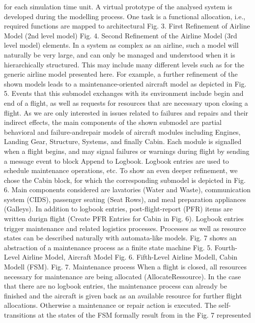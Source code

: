 for each simulation time unit.
A virtual prototype of the analysed system is developed
during the modelling process. One task is a functional allocation, i.e., required functions are mapped to architectural
Fig. 3. First Refinement of Airline Model (2nd level model)
Fig. 4. Second Refinement of the Airline Model (3rd level model)
elements. In a system as complex as an airline, such a model
will naturally be very large, and can only be managed and
understood when it is hierarchically structured. This may
include many different levels such as for the generic airline
model presented here. For example, a further refinement of the
shown models leads to a maintenance-oriented aircraft model
as depicted in Fig. 5. Events that this submodel exchanges
with its environment include begin and end of a flight, as well
as requests for resources that are necessary upon closing a
flight. As we are only interested in issues related to failures
and repairs and their indirect effects, the main components
of the shown submodel are partial behavioral and failure-andrepair models of aircraft modules including Engines, Landing
Gear, Structure, Systems, and finally Cabin. Each module
is signalled when a flight begins, and may signal failures or
warnings during flight by sending a message event to block
Append to Logbook. Logbook entries are used to schedule
maintenance operations, etc.
To show an even deeper refinement, we chose the Cabin
block, for which the corresponding submodel is depicted in
Fig. 6. Main components considered are lavatories (Water and
Waste), communication system (CIDS), passenger seating
(Seat Rows), and meal preparation appliances (Galleys).
In addition to logbook entries, post-flight-report (PFR)
items are written durign flight (Create PFR Entries for Cabin
in Fig. 6). Logbook entries trigger maintenance and related
logistics processes. Processes as well as resource states can be
described naturally with automata-like models. Fig. 7 shows an
abstraction of a maintenance process as a finite state machine
Fig. 5. Fourth-Level Airline Model, Aircraft Model
Fig. 6. Fifth-Level Airline Modell, Cabin Modell
(FSM).
Fig. 7. Maintenance process
When a flight is closed, all resources necessary for maintenance are being allocated (AllocateRessource). In the case
that there are no logbook entries, the maintenance process can
already be finished and the aircraft is given back as an available
resource for further flight allocations. Otherwise a maintenance
or repair action is executed. The self-transitions at the states
of the FSM formally result from in the Fig. 7 represented
